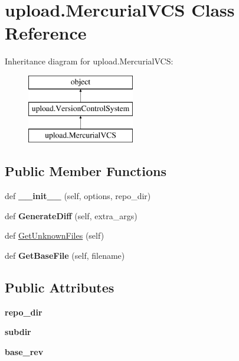\hypertarget{classupload_1_1_mercurial_v_c_s}{}\section{upload.\+Mercurial\+V\+CS Class Reference}
\label{classupload_1_1_mercurial_v_c_s}
Inheritance diagram for upload.\+Mercurial\+V\+CS\+:\begin{figure}[H]
\begin{center}
\leavevmode
\includegraphics[height=3.000000cm]{classupload_1_1_mercurial_v_c_s}
\end{center}
\end{figure}
\subsection*{Public Member Functions}
\begin{DoxyCompactItemize}
\item 
\mbox{\label{classupload_1_1_mercurial_v_c_s_a33890f442dedbb7d9fd45c08b5baed56}} 
def {\bfseries \+\_\+\+\_\+init\+\_\+\+\_\+} (self, options, repo\+\_\+dir)
\item 
\mbox{\label{classupload_1_1_mercurial_v_c_s_a6c05746012d8cd435c94ace1465671ef}} 
def {\bfseries Generate\+Diff} (self, extra\+\_\+args)
\item 
def \mbox{\hyperlink{classupload_1_1_mercurial_v_c_s_a6190899fb86cd09ad84cc5d4b0ebd2f3}{Get\+Unknown\+Files}} (self)
\item 
\mbox{\label{classupload_1_1_mercurial_v_c_s_a0cdc0cbe6ac4daab82f5f01e6ae2e670}} 
def {\bfseries Get\+Base\+File} (self, filename)
\end{DoxyCompactItemize}
\subsection*{Public Attributes}
\begin{DoxyCompactItemize}
\item 
\mbox{\label{classupload_1_1_mercurial_v_c_s_a219c1e0ab9ce864e3231913762ea489b}} 
{\bfseries repo\+\_\+dir}
\item 
\mbox{\label{classupload_1_1_mercurial_v_c_s_a0dad32e621f5523e3430d867184f0b42}} 
{\bfseries subdir}
\item 
\mbox{\label{classupload_1_1_mercurial_v_c_s_a41faae7820d5a015f4a42476e5e4ab8c}} 
{\bfseries base\+\_\+rev}
\end{DoxyCompactItemize}
